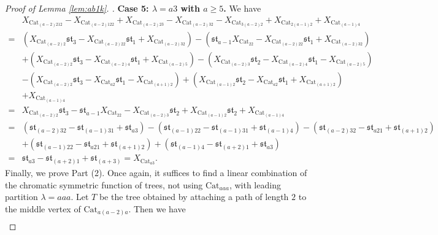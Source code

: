 \documentclass[10pt,a4paper]{amsart}
\begin{document}
\begin{proof}[Proof of Lemma \ref{lem:ab1k}. ]
\textbf{Case 5: $\lambda=a3$ with $a\geq 5$. } We have
\begin{align*}
&X_{\text{Cat}_{(a-2)212}}-X_{\text{Cat}_{(a-2)122}}+X_{\text{Cat}_{(a-2)23}}-X_{\text{Cat}_{(a-2)32}}-X_{\text{Cat}_{3(a-2)2}}+X_{\text{Cat}_{2(a-1)2}}+X_{\text{Cat}_{(a-1)4}}\\=&(X_{\text{Cat}_{(a-2)2}}\mathfrak{st}_3-X_{\text{Cat}_{(a-2)22}}\mathfrak{st}_1+X_{\text{Cat}_{(a-2)32}})-(\mathfrak{st}_{a-1}X_{\text{Cat}_{22}}-X_{\text{Cat}_{(a-2)22}}\mathfrak{st}_1+X_{\text{Cat}_{(a-2)32}})\\&+(X_{\text{Cat}_{(a-2)2}}\mathfrak{st}_3-X_{\text{Cat}_{(a-2)4}}\mathfrak{st}_1+X_{\text{Cat}_{(a-2)5}})-(X_{\text{Cat}_{(a-2)3}}\mathfrak{st}_2-X_{\text{Cat}_{(a-2)4}}\mathfrak{st}_1-X_{\text{Cat}_{(a-2)5}})\\&-(X_{\text{Cat}_{(a-2)2}}\mathfrak{st}_3-X_{\text{Cat}_{a2}}\mathfrak{st}_1-X_{\text{Cat}_{(a+1)2}})+(X_{\text{Cat}_{(a-1)2}}\mathfrak{st}_2-X_{\text{Cat}_{a2}}\mathfrak{st}_1+X_{\text{Cat}_{(a+1)2}})\\&+X_{\text{Cat}_{(a-1)4}}\\=&X_{\text{Cat}_{(a-2)2}}\mathfrak{st}_3-\mathfrak{st}_{a-1}X_{\text{Cat}_{22}}-X_{\text{Cat}_{(a-2)3}}\mathfrak{st}_2+X_{\text{Cat}_{(a-1)2}}\mathfrak{st}_2+X_{\text{Cat}_{(a-1)4}}\\=&(\mathfrak{st}_{(a-2)32}-\mathfrak{st}_{(a-1)31}+\mathfrak{st}_{a3})-(\mathfrak{st}_{(a-1)22}-\mathfrak{st}_{(a-1)31}+\mathfrak{st}_{(a-1)4})-(\mathfrak{st}_{(a-2)32}-\mathfrak{st}_{a21}+\mathfrak{st}_{(a+1)2})\\&+(\mathfrak{st}_{(a-1)22}-\mathfrak{st}_{a21}+\mathfrak{st}_{(a+1)2})+(\mathfrak{st}_{(a-1)4}-\mathfrak{st}_{(a+2)1}+\mathfrak{st}_{a3})\\=&\mathfrak{st}_{a3}-\mathfrak{st}_{(a+2)1}+\mathfrak{st}_{(a+3)}=X_{\text{Cat}_{a3}}.
\end{align*}
Finally, we prove Part (2). Once again, it suffices to find a linear combination of the chromatic symmetric function of trees, not using $\text{Cat}_{aaa}$, with leading partition $\lambda=aaa$. Let $T$ be the tree obtained by attaching a path of length $2$ to the middle vertex of $\text{Cat}_{a(a-2)a}$. Then we have
\begin{align*}

\end{align*}
\end{proof}
\end{document}
